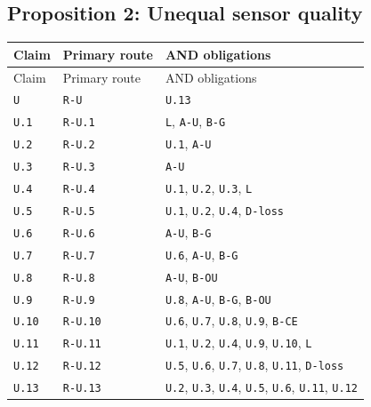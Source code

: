 \documentclass[11pt,letterpaper]{article}
\begin{document}
{\subsection{Proposition 2: Unequal sensor quality}
\begin{longtable}{>{\raggedright\arraybackslash}p{.14\linewidth}>{\raggedright\arraybackslash}p{.21\linewidth}>{\raggedright\arraybackslash}p{.54\linewidth}}
\toprule
Claim & Primary route & AND obligations \\
\midrule\endfirsthead
\toprule
Claim & Primary route & AND obligations \\
\midrule\endhead
\bottomrule\endfoot
\texttt{U} & \texttt{R-U} & \texttt{U.13} \\[3pt]
\texttt{U.1} & \texttt{R-U.1} & \texttt{L}, \texttt{A-U}, \texttt{B-G} \\[3pt]
\texttt{U.2} & \texttt{R-U.2} & \texttt{U.1}, \texttt{A-U} \\[3pt]
\texttt{U.3} & \texttt{R-U.3} & \texttt{A-U} \\[3pt]
\texttt{U.4} & \texttt{R-U.4} & \texttt{U.1}, \texttt{U.2}, \texttt{U.3}, \texttt{L} \\[3pt]
\texttt{U.5} & \texttt{R-U.5} & \texttt{U.1}, \texttt{U.2}, \texttt{U.4}, \texttt{D-loss} \\[3pt]
\texttt{U.6} & \texttt{R-U.6} & \texttt{A-U}, \texttt{B-G} \\[3pt]
\texttt{U.7} & \texttt{R-U.7} & \texttt{U.6}, \texttt{A-U}, \texttt{B-G} \\[3pt]
\texttt{U.8} & \texttt{R-U.8} & \texttt{A-U}, \texttt{B-OU} \\[3pt]
\texttt{U.9} & \texttt{R-U.9} & \texttt{U.8}, \texttt{A-U}, \texttt{B-G}, \texttt{B-OU} \\[3pt]
\texttt{U.10} & \texttt{R-U.10} & \texttt{U.6}, \texttt{U.7}, \texttt{U.8}, \texttt{U.9}, \texttt{B-CE} \\[3pt]
\texttt{U.11} & \texttt{R-U.11} & \texttt{U.1}, \texttt{U.2}, \texttt{U.4}, \texttt{U.9}, \texttt{U.10}, \texttt{L} \\[3pt]
\texttt{U.12} & \texttt{R-U.12} & \texttt{U.5}, \texttt{U.6}, \texttt{U.7}, \texttt{U.8}, \texttt{U.11}, \texttt{D-loss} \\*[3pt]
\texttt{U.13} & \texttt{R-U.13} & \texttt{U.2}, \texttt{U.3}, \texttt{U.4}, \texttt{U.5}, \texttt{U.6}, \texttt{U.11}, \texttt{U.12} \\[3pt]
\end{longtable}
}
\end{document}
